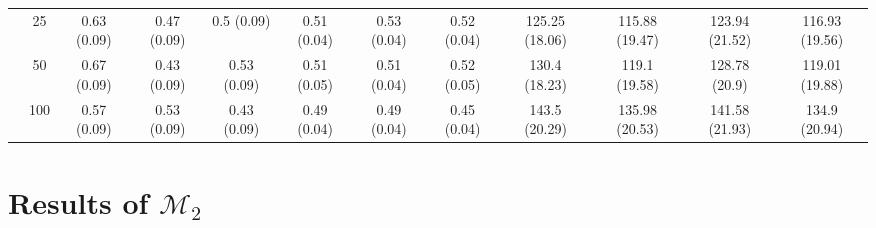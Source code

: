 \documentclass[10pt]{article}
\def\mc#1{\mathcal{#1}} %
\theoremstyle{definition}
\begin{document}
\begin{table}[H]
\begin{center}
{\begin{tabular}{cc|ccc|ccc|cccc|}
  & 25  & 0.63 (0.09) & 0.47 (0.09) & 0.5 (0.09) & 0.51 (0.04) & 0.53 (0.04) & 0.52 (0.04) & 125.25 (18.06) & 115.88 (19.47) & 123.94 (21.52) & 116.93 (19.56) \\ 
  & 50  & 0.67 (0.09) & 0.43 (0.09) & 0.53 (0.09) & 0.51 (0.05) & 0.51 (0.04) & 0.52 (0.05) & 130.4 (18.23) & 119.1 (19.58) & 128.78 (20.9) & 119.01 (19.88) \\ 
  & 100  & 0.57 (0.09) & 0.53 (0.09) & 0.43 (0.09) & 0.49 (0.04) & 0.49 (0.04) & 0.45 (0.04) & 143.5 (20.29) & 135.98 (20.53) & 141.58 (21.93) & 134.9 (20.94) \\ 
\end{tabular}}
   \end{center}
      \vspace{-.5cm}
\end{table}

\section{Results of $\mc{M}_2$}







\end{document}

